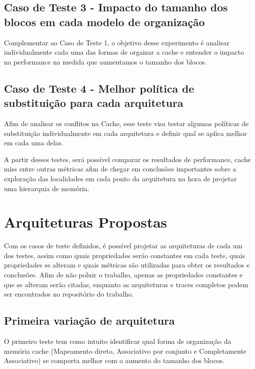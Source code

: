 \documentclass[conference]{IEEEtran}
\begin{document}
\subsection{Caso de Teste 3 - Impacto do tamanho dos blocos em cada modelo de organização}
Complementar ao Caso de Teste 1, o objetivo desse experimento é analisar individualmente cada uma das formas de orgaizar a cache e entender o impacto na performance na medida que aumentamos o tamanho dos blocos.

\subsection{Caso de Teste 4 - Melhor política de substituição para cada arquitetura}
Afim de analisar os conflitos na Cache, esse teste visa testar algumas políticas de substituição individualmente em cada arquitetura e definir qual se aplica melhor em cada uma delas.

A partir desses testes, será possível comparar os resultados de performance, cache miss entre outras métricas afim de chegar em conclusões importantes sobre a exploração das localidades em cada ponto da arquitetura na hora de projetar uma hierarquia de memória.


\section{Arquiteturas Propostas}
Com os casos de teste definidos, é possível projetar as arquiteturas de cada um dos testes, assim como quais propriedades serão constantes em cada teste, quais propriedades se alteram e quais métricas são utilizadas para obter os resultados e conclusões. Afim de não poluir o trabalho, apenas as propriedades constantes e que se alteram serão citadas, enquanto as arquiteturas e traces completos podem ser encontrados no repositório do trabalho.

\subsection{Primeira variação de arquitetura}
O primeiro teste tem como intuito identificar qual forma de organização da memória cache (Mapeamento direto, Associativo por conjunto e Completamente Associativo) se comporta melhor com o aumento do tamanho dos blocos.
\end{document}
